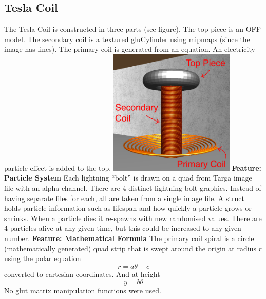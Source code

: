 \documentclass[10pt, oneside]{article}   	%
\begin{document}
\subsection{Tesla Coil}
The Tesla Coil is constructed in three parts (see figure).  The top piece is an OFF model.  The secondary coil is a textured gluCylinder using mipmaps (since the image has lines).  The primary coil is generated from an equation.  An electricity particle effect is added to the top.
\vspace{2mm}
\newline
\includegraphics[height=6cm]{coil.png}   %
\newline
\newline
\textbf{Feature: Particle System}\hspace{3mm} Each lightning ``bolt'' is drawn on a quad from Targa image file with an alpha channel.  There are 4 distinct lightning bolt graphics.  Instead of having separate files for each, all are taken from a single image file.  A struct holds particle information such as lifespan and how quickly a particle grows or shrinks.  When a particle dies it re-spawns with new randomised values.  There are 4 particles alive at any given time, but this could be increased to any given number.
\newline
\newline
\textbf{Feature: Mathematical Formula}\hspace{3mm} The primary coil spiral is a circle (mathematically generated) quad strip that is swept around the origin at radius $r$ using the polar equation
\begin{equation}
r = a\theta + c
\end{equation}
converted to cartesian coordinates.  And at height
\begin{equation}
y = b\theta
\end{equation}
No glut matrix manipulation functions were used.

\newpage
\end{document}
